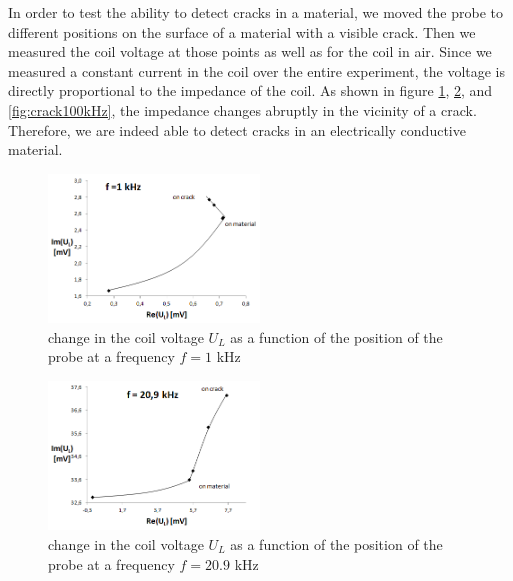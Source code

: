 In order to test the ability to detect cracks in a material, we moved the probe to different positions on the surface of a material with a visible crack. Then we measured the coil voltage at those points as well as for the coil in air. Since we measured a constant current in the coil over the entire experiment, the voltage is directly proportional to the impedance of the coil. As shown in figure \ref{fig:crack1kHz}, \ref{fig:crack21kHz}, and \ref{fig:crack100kHz}, the impedance changes abruptly in the vicinity of a crack. Therefore, we are indeed able to detect cracks in an electrically conductive material. %

\begin{figure}[htbp]
	\centering
		\includegraphics[width=0.50\textwidth]{img/crack1kHz}
	\caption{change in the coil voltage $U_L$ as a function of the position of the probe at a frequency $f=1$ kHz}
	\label{fig:crack1kHz}
\end{figure}

\begin{figure}[htbp]
	\centering
		\includegraphics[width=0.50\textwidth]{img/crack21kHz}
	\caption{change in the coil voltage $U_L$ as a function of the position of the probe at a frequency $f=20.9$ kHz}
	\label{fig:crack21kHz}
\end{figure}

